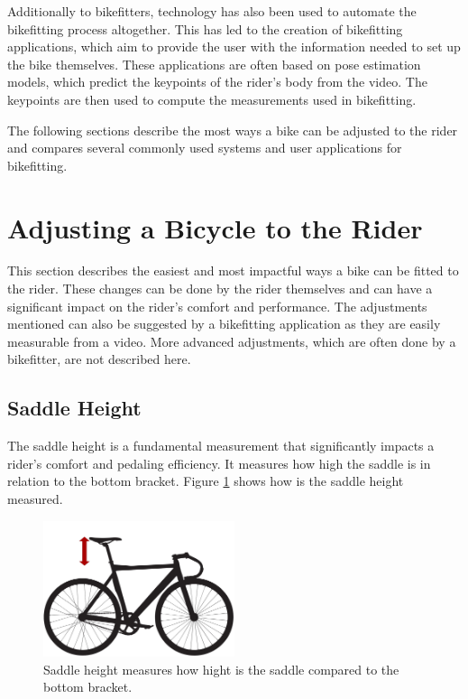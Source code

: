 Additionally to bikefitters, technology has also been used to automate the bikefitting process altogether. This has led to the creation of bikefitting applications, which aim to provide the user with the information needed to set up the bike themselves. These applications are often based on pose estimation models, which predict the keypoints of the rider's body from the video. The keypoints are then used to compute the measurements used in bikefitting.

The following sections describe the most ways a bike can be adjusted to the rider and compares several commonly used systems and user applications for bikefitting.

\section{Adjusting a Bicycle to the Rider}
This section describes the easiest and most impactful ways a bike can be fitted to the rider. These changes can be done by the rider themselves and can have a significant impact on the rider's comfort and performance. The adjustments mentioned can also be suggested by a bikefitting application as they are easily measurable from a video. More advanced adjustments, which are often done by a bikefitter, are not described here.

\subsection{Saddle Height}
The saddle height is a fundamental measurement that significantly impacts a rider's comfort and pedaling efficiency. It measures how high the saddle is in relation to the bottom bracket. Figure \ref{fig:saddle_height_icon} shows how is the saddle height measured.
\begin{figure}[htb]
    \centering
    \includegraphics[width=0.5\textwidth]{obrazky-figures/saddle_height_small.png}
    \caption{Saddle height measures how hight is the saddle compared to the bottom bracket.}
    \label{fig:saddle_height_icon}
\end{figure}

